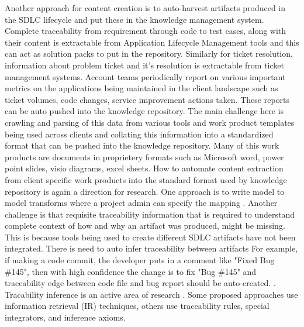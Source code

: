 Another approach for content creation is to auto-harvest artifacts produced in the SDLC lifecycle and put these in the knowledge management system. Complete traceability from requirement through code to test cases, along with their content is extractable from Application Lifecycle Management tools and this can act as solution packs to put in the repository. Similarly for ticket resolution, information about problem ticket and it's resolution is extractable from ticket management systems. Account teams periodically report on various important metrics on the applications being maintained in the client landscape such as ticket volumes, code changes, service improvement actions taken. These reports can be auto pushed into the knowledge repository. The main challenge here is crawling and parsing of this data from various tools and work product templates being used across clients and collating this information into a standardized format that can be pushed into the knowledge repository. Many of this work products are documents in proprietery formats such as Microsoft word, power point slides, visio diagrams, excel sheets. How to automate content extraction from client specific work products into the standard format used by knowledge repository is again a direction for research. One approach is to write model to model transforms where a project admin can specify the mapping \cite{debdoot:2010:scc}. Another challenge is that requisite traceability information that is required to understand complete context of how and why an artifact was produced, might be missing. This is because tools being used to create different SDLC artifacts have not been integrated. There is need to auto infer traceability between artifacts
For example, if making a code commit, the developer puts in a comment like "Fixed Bug \#145", then with high confidence the change is to fix "Bug \#145" and traceability edge between code file and bug report should be auto-created. 
. Tracability inference is an active area of research \cite{spanoudakis2005software}. Some proposed approaches use information retrieval (IR) techniques, others use traceability rules, special integrators, and inference axioms.


